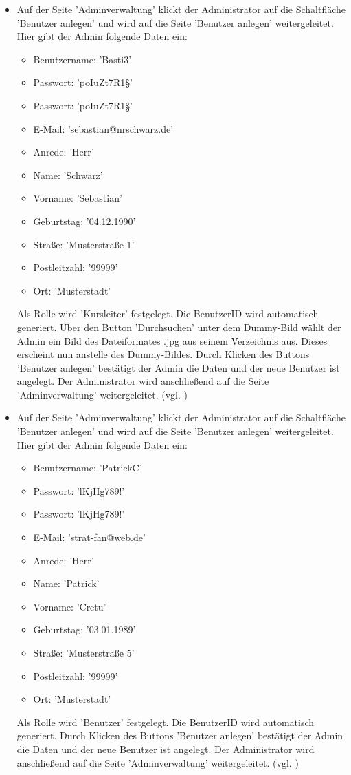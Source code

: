 \documentclass[a4paper]{scrreprt}
\begin{document}
\begin{itemize}
				\item {} 
				 Auf der Seite 'Adminverwaltung' klickt der Administrator auf die Schaltfläche 'Benutzer anlegen' und wird auf die Seite 'Benutzer anlegen' weitergeleitet. Hier gibt der Admin folgende Daten ein:
					\begin{itemize}
						\item Benutzername: 'Basti3' 
						\item Passwort: 'poIuZt7R1§'
						\item Passwort: 'poIuZt7R1§'
						\item E-Mail: 'sebastian@nrschwarz.de'
						\item Anrede: 'Herr'
						\item Name: 'Schwarz'
						\item Vorname: 'Sebastian'
						\item Geburtstag: '04.12.1990'
						\item Straße: 'Musterstraße 1'
						\item Postleitzahl: '99999'
						\item Ort: 'Musterstadt'
					\end{itemize}
				 Als Rolle wird 'Kursleiter' festgelegt. Die BenutzerID wird automatisch generiert. Über den Button 'Durchsuchen' unter dem Dummy-Bild wählt der Admin ein Bild des Dateiformates .jpg aus seinem Verzeichnis aus. Dieses erscheint nun anstelle des Dummy-Bildes. Durch Klicken des Buttons 'Benutzer anlegen' bestätigt der Admin die Daten und der neue Benutzer ist angelegt. Der Administrator wird anschließend auf die Seite 'Adminverwaltung' weitergeleitet. (vgl. )
				
				\item {} 
				Auf der Seite 'Adminverwaltung' klickt der Administrator auf die Schaltfläche 'Benutzer anlegen' und wird auf die Seite 'Benutzer anlegen' weitergeleitet. Hier gibt der Admin folgende Daten ein:
				\begin{itemize}
					\item Benutzername: 'PatrickC' 
					\item Passwort: 'lKjHg789!'
					\item Passwort: 'lKjHg789!'
					\item E-Mail: 'strat-fan@web.de'
					\item Anrede: 'Herr'
					\item Name: 'Patrick'
					\item Vorname: 'Cretu'
					\item Geburtstag: '03.01.1989'
					\item Straße: 'Musterstraße 5'
					\item Postleitzahl: '99999'
					\item Ort: 'Musterstadt'
				\end{itemize}
				Als Rolle wird 'Benutzer' festgelegt. Die BenutzerID wird automatisch generiert. Durch Klicken des Buttons 'Benutzer anlegen' bestätigt der Admin die Daten und der neue Benutzer ist angelegt. Der Administrator wird anschließend auf die Seite 'Adminverwaltung' weitergeleitet. (vgl. )
				

\end{itemize}
\end{document}
